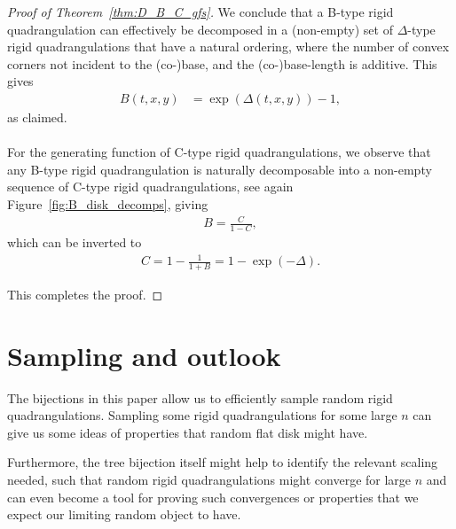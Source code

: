 \documentclass[11pt]{article}
\theoremstyle{plain}
\theoremstyle{definition}
\begin{document}
\begin{proof}[Proof of Theorem~\ref{thm:D_B_C_gfs}]
    We conclude that a B-type rigid quadrangulation can effectively be decomposed in a (non-empty) set of $\Delta$-type rigid quadrangulations that have a natural ordering, where the number of convex corners not incident to the (co-)base, and the (co-)base-length is additive. 
    This gives 
    \begin{align}
        B(t,x,y)&=\exp(\Delta(t,x,y))-1,
    \end{align}
    as claimed.
\\
\\
    For the generating function of C-type rigid quadrangulations, we observe that any B-type rigid quadrangulation is naturally decomposable into a non-empty sequence of C-type rigid quadrangulations, see again Figure~\ref{fig:B_disk_decomps}, giving
    \begin{align}
        B=\frac{C}{1-C},
    \end{align}
    which can be inverted to
    \begin{align}
        C=1-\frac{1}{1+B}=1-\exp(-\Delta).
    \end{align} 

    This completes the proof.
\end{proof}


\clearpage
\FloatBarrier
\section{Sampling and outlook}\label{sec:sampling_outlook}
\FloatBarrier
The bijections in this paper allow us to efficiently sample random rigid quadrangulations. 
Sampling some rigid quadrangulations for some large $n$ can give us some ideas of properties that random flat disk might have. 

Furthermore, the tree bijection itself might help to identify the relevant scaling needed, such that random rigid quadrangulations might converge for large $n$ and can even become a tool for proving such convergences or properties that we expect our limiting random object to have.
\end{document}
